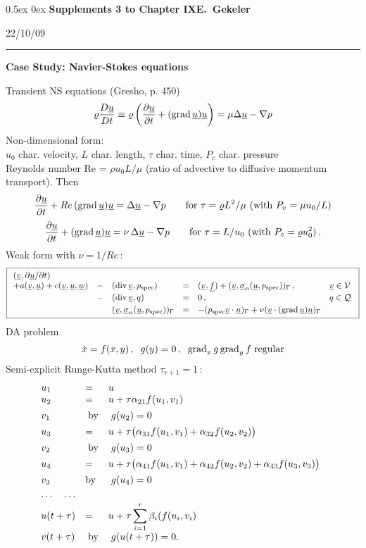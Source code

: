 \documentclass[12pt,a4paper,USenglish,twoside]{book}
\begin{document}
\setlength{\fboxsep}{1ex}
\newcommand{\Release}{22/10/09}
\addtolength{\abovedisplayshortskip}{-1ex}
\setlength{\fboxsep}{1.5ex}
\parskip0.5ex
\parindent0ex
\mainmatter
%
{\large\bf Supplements 3 to Chapter IX\hfill E.\ Gekeler
}
\par
\vspace{-1mm}
\hfill{\footnotesize\Release\ }
\par
\vspace{-2mm}
\rule{\textwidth}{1pt}
\par\vspace{2ex}
{\bf Case Study: Navier-Stokes equations}
\par
%
Transient NS equations (Gresho, p. 450)
%
\[
\rho \frac{D\u}{D t} \equiv 
\rho \left(\frac{\da \u}{\da t} +  (\grad \u)\u\right) 
= \mu \Delta \u - \nabla p 
\] 
Non-dimensional form:\\
$u_0$ char. velocity, $L$ char. length, $\tau$ char. time, $P_c$ char. pressure\\
{\sc Reynolds} number Re = $\rho u_0 L/\mu$ 
(ratio of advective to diffusive momentum transport). Then
\[
\frac{\da \u}{\da t} +  Re \,(\grad \u)\u 
=   \Delta \u - \nabla p \quad \quad
\text{for $\tau = \rho L^2/\mu$ (with $P_v =  \mu u_0/L$)}
\] 
%
\[
\frac{\da \u}{\da t} +  (\grad \u)\u 
= \nu\, \Delta \u - \nabla p \quad \quad
\text{for $\tau = L/u_0$ (with $P_c = \rho u^2_0$)}\,.
\] 
Weak form with $\nu = 1/Re$\,:
\begin{equation} \label{e0811.4}
\fbox{$\
\ba{.}{llllll}
(\v,\da \u/\da t)\\
 + a(\v,\u)  + c(\v,\u,\w)&-&(\div \v,p_{\rm spec}) &=& (\v,\f)
+ (\v,\ul{\sigma}_n(\u,p_{\rm spec}))_{\Gamma}\,, & \v \in \V \\[0.5ex]
&-&(\div \v,q) &=& 0\,, & q \in \Q\\[0.5ex]
&&(\v,\ul{\sigma}_n(\u,p_{\rm spec}))_{\Gamma}
&=& -(p_{\rm spec}\v\cdot \n)_{\Gamma} + \nu(\v\cdot (\grad \u)\n)_{\Gamma} 
\ea{.}
$}
\end{equation}
DA problem
\[
\dot{x} = f(x,y)\,,\;\; g(y) = 0\,,\;\; \grad_xg \grad_yf \; \text{regular}
\]
Semi-explicit Runge-Kutta method $\tau_{r+1} = 1$\,:
\[
\ba{.}{lll}
u_1 &=& u\\
u_2 &=& u + \tau \alpha_{21}f(u_1,v_1)\\[1ex]
v_1 &\; \text{by}& \; g(u_2) = 0\\[1ex]
u_3 &=& u + \tau \big(\alpha_{31}f(u_1,v_1) + \alpha_{32}f(u_2,v_2)\big)\\[1ex]
v_2 &\; \text{by}& \; g(u_3) = 0\\[1ex]

u_4 &=& u + \tau \big(\alpha_{41}f(u_1,v_1) + \alpha_{42}f(u_2,v_2)
+ \alpha_{43}f(u_3,v_3)\big)\\[1ex]
v_3 & \text{by}& \; g(u_4) = 0\\[1ex]
\cdots \quad \cdots\\
u(t+\tau) &=& \dis u + \tau \sum_{i=1}^r\beta_i(f(u_i,v_i)\\[1ex]
v(t + \tau) & \;\text{by} &\; g(u(t+\tau)) = 0.
\ea{.}
\]
\end{document}
